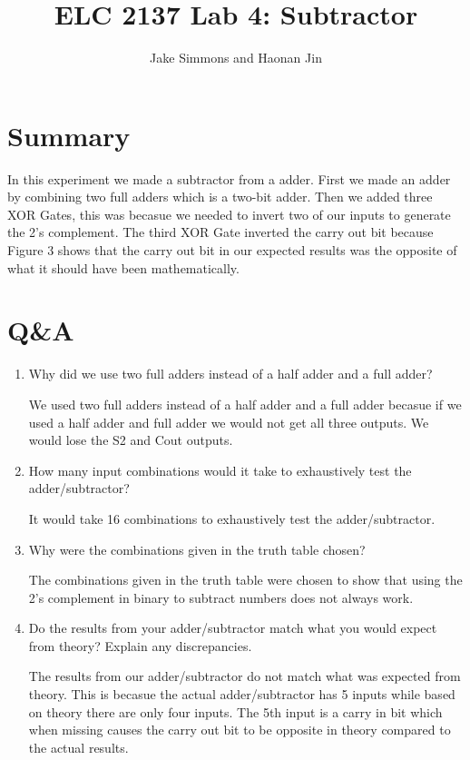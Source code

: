 \documentclass[11pt]{article}
\begin{document}
\title{ELC 2137 Lab 4: Subtractor}
\author{Jake Simmons and Haonan Jin }

\maketitle


\section*{Summary}

In this experiment we made a subtractor from a adder. First we made an adder by combining two full adders which is a two-bit adder. Then we added three XOR Gates, this was becasue we needed to invert two of our inputs to generate the 2's complement. The third XOR Gate inverted the carry out bit because Figure 3 shows that the carry out bit in our expected results was the opposite of what it should have been mathematically.


\section*{Q\&A}

\begin{enumerate}
	\item Why did we use two full adders instead of a half adder and a full adder?
	
		We used two full adders instead of a half adder and a full adder becasue if we used a half adder and full adder we would not get all three outputs. We would lose the S2 and Cout outputs.  

	\item How many input combinations would it take to exhaustively test the adder/subtractor?
	
		It would take 16 combinations to exhaustively test the adder/subtractor. 

	\item Why were the combinations given in the truth table chosen?
	
		The combinations given in the truth table were chosen to show that using the 2's complement in binary to subtract numbers does not always work.

	\item Do the results from your adder/subtractor match what you would expect from theory? Explain any discrepancies.
	
		The results from our adder/subtractor do not match what was expected from theory. This is becasue the actual adder/subtractor has 5 inputs while based on theory there are only four inputs. The 5th input is a carry in bit which when missing causes the carry out bit to be opposite in theory compared to the actual results. 

\end{enumerate}
\end{document}
